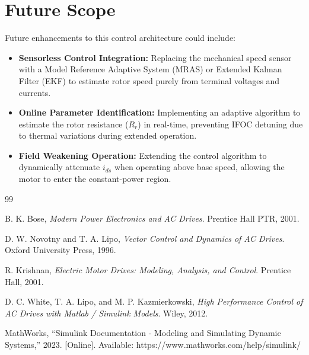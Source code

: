 \documentclass[12pt,a4paper]{report}
\begin{document}
\section{Future Scope}
Future enhancements to this control architecture could include:
\begin{itemize}
    \item \textbf{Sensorless Control Integration:} Replacing the mechanical speed sensor with a Model Reference Adaptive System (MRAS) or Extended Kalman Filter (EKF) to estimate rotor speed purely from terminal voltages and currents.
    \item \textbf{Online Parameter Identification:} Implementing an adaptive algorithm to estimate the rotor resistance ($R_r$) in real-time, preventing IFOC detuning due to thermal variations during extended operation.
    \item \textbf{Field Weakening Operation:} Extending the control algorithm to dynamically attenuate $i_{ds}$ when operating above base speed, allowing the motor to enter the constant-power region.
\end{itemize}

\newpage
\begin{thebibliography}{99}

B. K. Bose, \emph{Modern Power Electronics and AC Drives}. Prentice Hall PTR, 2001.

D. W. Novotny and T. A. Lipo, \emph{Vector Control and Dynamics of AC Drives}. Oxford University Press, 1996.

R. Krishnan, \emph{Electric Motor Drives: Modeling, Analysis, and Control}. Prentice Hall, 2001.

D. C. White, T. A. Lipo, and M. P. Kazmierkowski, \emph{High Performance Control of AC Drives with Matlab / Simulink Models}. Wiley, 2012.

MathWorks, ``Simulink Documentation - Modeling and Simulating Dynamic Systems,'' 2023. [Online]. Available: https://www.mathworks.com/help/simulink/

\end{thebibliography}
\end{document}
